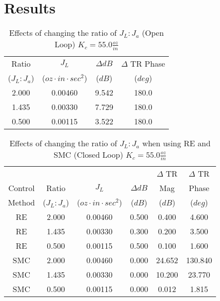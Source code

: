 \section{Results}\label{sec:results}


\begin{center}
	\begin{table}\label{table:resultsOpenLoop}
	\caption{Effects of changing the ratio of $J_L:J_a$ (Open Loop) $K_c=55.0\frac{oz}{in}$}
	\begin{center}
  \begin{tabular}{  c | c | c | c }

Ratio					& $J_L$										& $\Delta dB$	& $\Delta$ TR Phase \\ 
($J_L:J_a$)		&($oz\cdot in\cdot sec^2$)& ($dB$)			& ($deg$)							\\	\hline
\hline
2.000  				&0.00460  								&9.542  			&180.0							\\	\hline
1.435  				&0.00330  								&7.729  			&180.0							\\	\hline
0.500  				&0.00115  								&3.522  			&180.0							\\

  \end{tabular}
  \end{center}
  \end{table}
\end{center}


\begin{center}
	\begin{table}\label{table:resultsClosedLoop}
	\caption{Effects of changing the ratio of $J_L:J_a$ when using RE and SMC (Closed Loop) $K_c=55.0\frac{oz}{in}$}
	\begin{center}
  \begin{tabular}{ c | c | c | c | c | c }
						&								& 												& 								& $\Delta$ TR 		& $\Delta$ TR 			\\ 
Control			&Ratio					& $J_L$										& $\Delta dB$			& Mag 						& Phase 						\\ 
Method			&($J_L:J_a$)		&($oz\cdot in\cdot sec^2$)& ($dB$)					& ($dB$)					& ($deg$)						\\	\hline
\hline
RE 					&2.000  				&0.00460  								&0.500  					&0.400  					&4.600							\\	\hline
RE 					&1.435  				&0.00330  								&0.300  					&0.200  					&3.500							\\	\hline
RE 					&0.500  				&0.00115  								&0.500  					&0.100  					&1.600							\\	\hline
\hline
SMC 				&2.000  				&0.00460  								&0.000  					&24.652  					&130.840						\\	\hline
SMC 				&1.435  				&0.00330  								&0.000  					&10.200  					&23.770							\\	\hline
SMC 				&0.500  				&0.00115  								&0.000  					&0.012  					&1.815							\\	


  \end{tabular}
  \end{center}
  \end{table}
\end{center}
